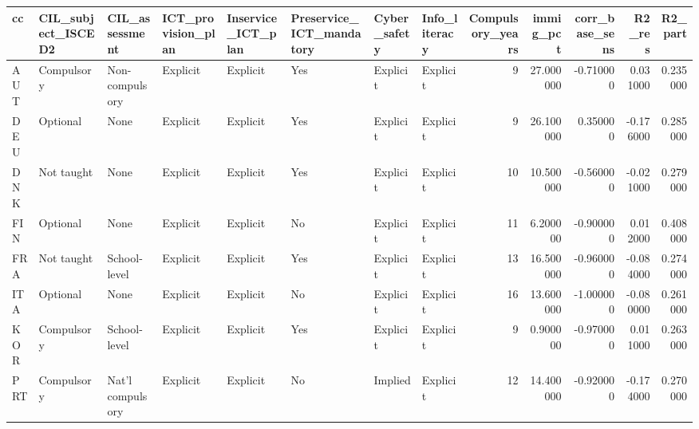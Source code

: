 \begin{tabular}{llllllllrrrrr}
\toprule
cc & CIL_subject_ISCED2 & CIL_assessment & ICT_provision_plan & Inservice_ICT_plan & Preservice_ICT_mandatory & Cyber_safety & Info_literacy & Compulsory_years & immig_pct & corr_base_sens & R2_res & R2_part \\
\midrule
AUT & Compulsory & Non-compulsory & Explicit & Explicit & Yes & Explicit & Explicit & 9 & 27.000000 & -0.710000 & 0.031000 & 0.235000 \\
DEU & Optional & None & Explicit & Explicit & Yes & Explicit & Explicit & 9 & 26.100000 & 0.350000 & -0.176000 & 0.285000 \\
DNK & Not taught & None & Explicit & Explicit & Yes & Explicit & Explicit & 10 & 10.500000 & -0.560000 & -0.021000 & 0.279000 \\
FIN & Optional & None & Explicit & Explicit & No & Explicit & Explicit & 11 & 6.200000 & -0.900000 & 0.012000 & 0.408000 \\
FRA & Not taught & School-level & Explicit & Explicit & Yes & Explicit & Explicit & 13 & 16.500000 & -0.960000 & -0.084000 & 0.274000 \\
ITA & Optional & None & Explicit & Explicit & No & Explicit & Explicit & 16 & 13.600000 & -1.000000 & -0.080000 & 0.261000 \\
KOR & Compulsory & School-level & Explicit & Explicit & Yes & Explicit & Explicit & 9 & 0.900000 & -0.970000 & 0.011000 & 0.263000 \\
PRT & Compulsory & Nat'l compulsory & Explicit & Explicit & No & Implied & Explicit & 12 & 14.400000 & -0.920000 & -0.174000 & 0.270000 \\
\bottomrule
\end{tabular}
